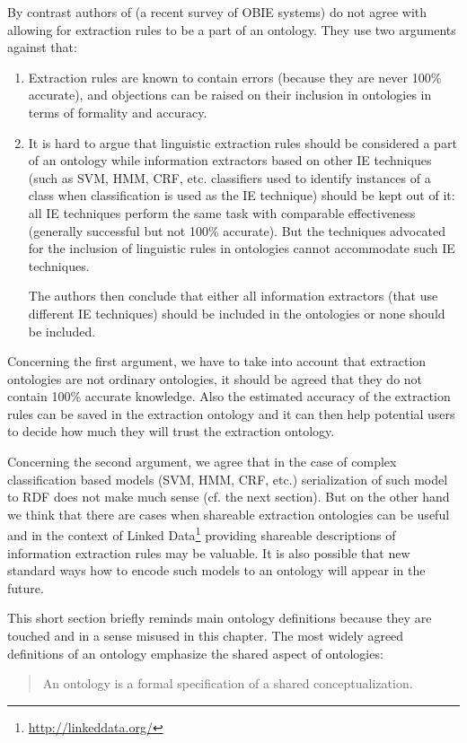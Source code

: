 By contrast authors of \citep{citeulike:7291004} (a recent survey of OBIE systems) do not agree with allowing for extraction rules to be a part of an ontology. They use two arguments against that:
\begin{enumerate}
	\item Extraction rules are known to contain errors (because they are never 100\% accurate), and objections can be raised on their inclusion in ontologies in terms of formality and accuracy.

	\item It is hard to argue that linguistic extraction rules should be considered a part of an ontology while information extractors based on other IE techniques (such as SVM, HMM, CRF, etc. classifiers used to identify instances of a class when classification is used as the IE technique) should be kept out of it: all IE techniques perform the same task with comparable effectiveness (generally successful but not 100\% accurate). But the techniques advocated for the inclusion of linguistic rules in ontologies cannot accommodate such IE techniques.
	
The authors then conclude that either all information extractors (that use different IE techniques) should be included in the ontologies or none should be included.
\end{enumerate}



Concerning the first argument, we have to take into account that extraction ontologies are not ordinary ontologies, it should be agreed that they do not contain 100\% accurate knowledge. Also the estimated accuracy of the extraction rules can be saved in the extraction ontology and it can then help potential users to decide how much they will trust the extraction ontology.

Concerning the second argument, we agree that in the case of complex classification based models (SVM, HMM, CRF, etc.) serialization of such model to RDF does not make much sense (cf. the next section). But on the other hand we think that there are cases when shareable extraction ontologies can be useful and in the context of Linked Data\footnote{\url{http://linkeddata.org/}} providing shareable descriptions of information extraction rules may be valuable. It is also possible that new standard ways how to encode such models to an ontology will appear in the future.


This short section briefly reminds main ontology definitions because they are touched and in a sense misused in this chapter. The most widely agreed definitions of an ontology emphasize the shared aspect of ontologies: 
\begin{quote}
An ontology is a formal specification of a shared conceptualization.	\citep{so17864}
\end{quote}

